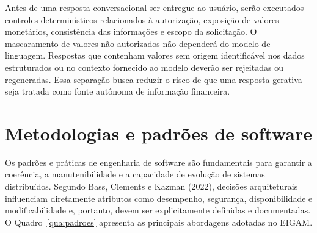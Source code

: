Antes de uma resposta conversacional ser entregue ao usuário, serão executados controles determinísticos relacionados à autorização, exposição de valores monetários, consistência das informações e escopo da solicitação. O mascaramento de valores não autorizados não dependerá do modelo de linguagem. Respostas que contenham valores sem origem identificável nos dados estruturados ou no contexto fornecido ao modelo deverão ser rejeitadas ou regeneradas. Essa separação busca reduzir o risco de que uma resposta gerativa seja tratada como fonte autônoma de informação financeira.


\section{Metodologias e padrões de software}

Os padrões e práticas de engenharia de software são fundamentais para garantir a coerência, a manutenibilidade e a capacidade de evolução de sistemas distribuídos. Segundo Bass, Clements e Kazman (2022), decisões arquiteturais influenciam diretamente atributos como desempenho, segurança, disponibilidade e modificabilidade e, portanto, devem ser explicitamente definidas e documentadas. O Quadro~\ref{qua:padroes} apresenta as principais abordagens adotadas no EIGAM.

